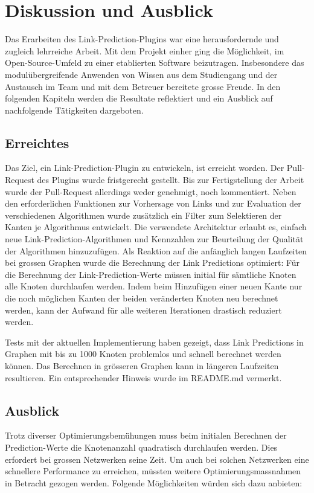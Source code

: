 \chapter{Diskussion und Ausblick}

Das Erarbeiten des Link-Prediction-Plugins war eine herausfordernde und zugleich lehrreiche Arbeit.
Mit dem Projekt einher ging die Möglichkeit, im Open-Source-Umfeld zu einer etablierten Software beizutragen.
Insbesondere das modulübergreifende Anwenden von Wissen aus dem Studiengang und der Austausch im Team und mit dem Betreuer bereitete grosse Freude.
In den folgenden Kapiteln werden die Resultate reflektiert und ein Ausblick auf nachfolgende Tätigkeiten dargeboten.

\section{Erreichtes}

Das Ziel, ein Link-Prediction-Plugin zu entwickeln, ist erreicht worden. Der Pull-Request des Plugins wurde fristgerecht gestellt.
Bis zur Fertigstellung der Arbeit wurde der Pull-Request allerdings weder genehmigt, noch kommentiert.
Neben den erforderlichen Funktionen zur Vorhersage von Links und zur Evaluation der verschiedenen Algorithmen wurde zusätzlich ein Filter zum Selektieren der Kanten je Algorithmus entwickelt.
Die verwendete Architektur erlaubt es, einfach neue Link-Prediction-Algorithmen und Kennzahlen zur Beurteilung der Qualität der Algorithmen hinzuzufügen.
Als Reaktion auf die anfänglich langen Laufzeiten bei grossen Graphen wurde die Berechnung der Link Predictions optimiert:
Für die Berechnung der Link-Prediction-Werte müssen initial für sämtliche Knoten alle Knoten durchlaufen werden.
Indem beim Hinzufügen einer neuen Kante nur die noch möglichen Kanten der beiden veränderten Knoten neu berechnet werden, kann der Aufwand für alle weiteren Iterationen drastisch reduziert werden.

Tests mit der aktuellen Implementierung haben gezeigt, dass Link Predictions in Graphen mit bis zu 1000 Knoten problemlos und schnell berechnet werden können.
Das Berechnen in grösseren Graphen kann in längeren Laufzeiten resultieren.
Ein entsprechender Hinweis wurde im README.md vermerkt.

\section{Ausblick}

Trotz diverser Optimierungsbemühungen muss beim initialen Berechnen der Prediction-Werte die Knotenanzahl quadratisch durchlaufen werden.
Dies erfordert bei grossen Netzwerken seine Zeit.
Um auch bei solchen Netzwerken eine schnellere Performance zu erreichen, müssten weitere Optimierungsmassnahmen in Betracht gezogen werden.
Folgende Möglichkeiten würden sich dazu anbieten:

